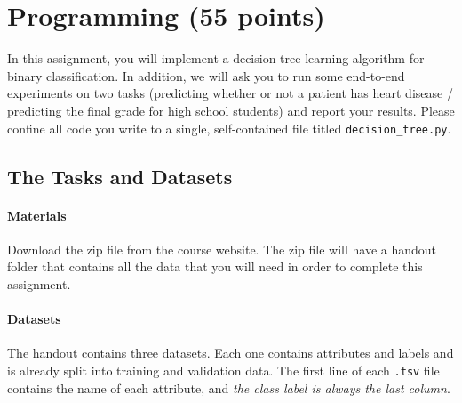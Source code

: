 \section{Programming (55 points)}

In this assignment, you will implement a decision tree learning algorithm for binary classification. In addition, we will ask you to run some end-to-end experiments on two tasks (predicting whether or not a patient has heart disease / predicting the final grade for high school students) and report your results. Please confine all code you write to a single, self-contained file titled \texttt{decision\_tree.py}. 


\subsection{The Tasks and Datasets}
\label{sec:data}

\paragraph{Materials} Download the zip file from the course website. The zip file will have a handout folder that contains all the data that you will need in order to complete this assignment.


\paragraph{Datasets}

The handout contains three datasets. Each one contains attributes and labels and is already split into training and validation data. The first line of each \lstinline{.tsv} file contains the name of each attribute, and \emph{the class label is always the last column}.

